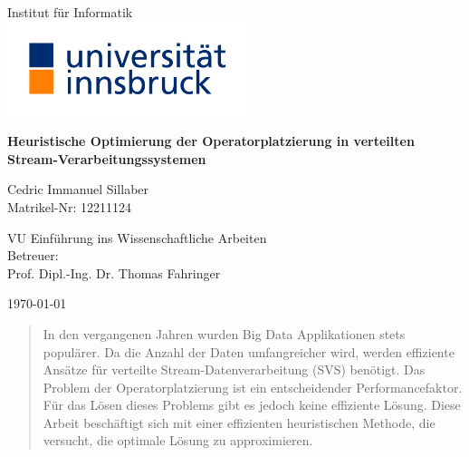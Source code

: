 \documentclass{article}
\begin{document}
\begin{titlepage}
      \begin{center}
          \Huge
           \\
          \vspace{1cm} %
          \Large
          Institut f\"ur Informatik \\
          \vspace{1cm}
          \includegraphics[width=7cm]{universitaet-innsbruck-logo-cmyk-farbe.jpg}

          \Huge
          \textbf{Heuristische Optimierung der Operatorplatzierung in verteilten Stream-Verarbeitungssystemen} \\
          \vspace{3cm} %

          \Large
          Cedric Immanuel Sillaber \\
          Matrikel-Nr: 12211124
          
          \vspace{1cm}
          \large
          VU Einführung ins Wissenschaftliche Arbeiten \\
          \vspace{4cm}
          \normalsize
          Betreuer:\\ Prof. Dipl.-Ing. Dr. Thomas Fahringer
          
          \vfill 
          
          \large
          \today
      \end{center}
  \end{titlepage}
\begin{abstract}
In den vergangenen Jahren wurden Big Data Applikationen stets populärer. 
Da die Anzahl der Daten umfangreicher wird, werden effiziente Ansätze für 
verteilte Stream-Datenverarbeitung (SVS) benötigt.
Das Problem der Operatorplatzierung ist ein entscheidender Performancefaktor. 
Für das Lösen dieses Problems gibt es jedoch keine 
effiziente Lösung. Diese Arbeit beschäftigt sich mit einer effizienten heuristischen Methode, die versucht,
die optimale Lösung zu approximieren. 
\end{abstract}
\end{document}
